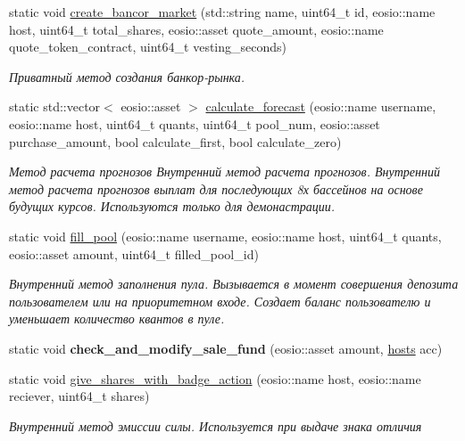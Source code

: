 \begin{DoxyCompactItemize}
static void \mbox{\hyperlink{classeosio_1_1unicore_a742e69fc7bf0443263f4082845a5325f}{create\+\_\+bancor\+\_\+market}} (std\+::string name, uint64\+\_\+t id, eosio\+::name host, uint64\+\_\+t total\+\_\+shares, eosio\+::asset quote\+\_\+amount, eosio\+::name quote\+\_\+token\+\_\+contract, uint64\+\_\+t vesting\+\_\+seconds)
\begin{DoxyCompactList}\small\item\em Приватный метод создания банкор-\/рынка. \end{DoxyCompactList}\item 
static std\+::vector$<$ eosio\+::asset $>$ \mbox{\hyperlink{classeosio_1_1unicore_a4b687f72582684ca991a201209ec46dd}{calculate\+\_\+forecast}} (eosio\+::name username, eosio\+::name host, uint64\+\_\+t quants, uint64\+\_\+t pool\+\_\+num, eosio\+::asset purchase\+\_\+amount, bool calculate\+\_\+first, bool calculate\+\_\+zero)
\begin{DoxyCompactList}\small\item\em Метод расчета прогнозов Внутренний метод расчета прогнозов. Внутренний метод расчета прогнозов выплат для последующих 8х бассейнов на основе будущих курсов. Используются только для демонастрации. \end{DoxyCompactList}\item 
static void \mbox{\hyperlink{classeosio_1_1unicore_a81f044d8edee706d224c4569581df805}{fill\+\_\+pool}} (eosio\+::name username, eosio\+::name host, uint64\+\_\+t quants, eosio\+::asset amount, uint64\+\_\+t filled\+\_\+pool\+\_\+id)
\begin{DoxyCompactList}\small\item\em Внутренний метод заполнения пула. Вызывается в момент совершения депозита пользователем или на приоритетном входе. Создает баланс пользователю и уменьшает количество квантов в пуле. \end{DoxyCompactList}\item 
\mbox{\label{classeosio_1_1unicore_af243d3a5cddb5eb97bafc5cc046818c3}} 
static void {\bfseries check\+\_\+and\+\_\+modify\+\_\+sale\+\_\+fund} (eosio\+::asset amount, \mbox{\hyperlink{structhosts}{hosts}} acc)
\item 
static void \mbox{\hyperlink{classeosio_1_1unicore_a2c500017101260f67b0e8ad3a3b6acfc}{give\+\_\+shares\+\_\+with\+\_\+badge\+\_\+action}} (eosio\+::name host, eosio\+::name reciever, uint64\+\_\+t shares)
\begin{DoxyCompactList}\small\item\em Внутренний метод эмиссии силы. Используется при выдаче знака отличия \end{DoxyCompactList}\item 

\end{DoxyCompactItemize}
